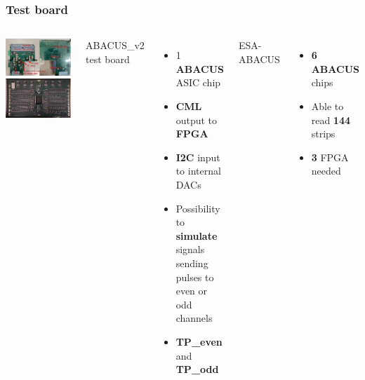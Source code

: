 \documentclass[aspectratio=169]{beamer}
\begin{document}
	\begin{frame}
	\frametitle{Test board}
		\begin{columns}
			\begin{center}
				\includegraphics[width=0.8 \textwidth]{IMG/TestBoard.pdf}
				\includegraphics[width=0.8 \textwidth]{IMG/EsaAbacus.png}
			\end{center}
			{\color{blue}ABACUS\_v2 test board}
			\begin{itemize}
				\item 1 \textbf{ABACUS} ASIC chip
				\item \textbf{CML} output to \textbf{FPGA}
				\item \textbf{I2C} input to internal DACs
				\item Possibility to \textbf{simulate} signals sending pulses to even or odd channels
				\item \textbf{TP\_even} and \textbf{TP\_odd} 
			\end{itemize}
			{\color{blue}ESA-ABACUS}
			\begin{itemize}
				\item \textbf{6 ABACUS} chips
				\item Able to read \textbf{144} strips
				\item \textbf{3} FPGA needed
			\end{itemize}
		\end{columns}	
	\end{frame}
\end{document}
